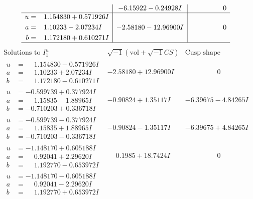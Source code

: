 \documentclass[1p]{elsarticle_modified}
\theoremstyle{definition}
\newcommand{\I}{\sqrt{-1}}
\begin{document}
$$\begin{array}{c|c|c}
 & -6.15922 - 0.24928 I & \phantom{-0.000000 } 0 \\ \hline\begin{aligned}
u &= \phantom{-}1.154830 + 0.571926 I \\
a &= \phantom{-}1.10233 - 2.07234 I \\
b &= \phantom{-}1.172180 + 0.610271 I\end{aligned}
 & -2.58180 - 12.96900 I & \phantom{-0.000000 } 0\\
 \hline 
 \end{array}$$\newpage$$\begin{array}{c|c|c}  
\text{Solutions to }I^u_{1}& \I (\text{vol} + \sqrt{-1}CS) & \text{Cusp shape}\\
 \hline 
\begin{aligned}
u &= \phantom{-}1.154830 - 0.571926 I \\
a &= \phantom{-}1.10233 + 2.07234 I \\
b &= \phantom{-}1.172180 - 0.610271 I\end{aligned}
 & -2.58180 + 12.96900 I & \phantom{-0.000000 } 0 \\ \hline\begin{aligned}
u &= -0.599739 + 0.377924 I \\
a &= \phantom{-}1.15835 - 1.88965 I \\
b &= -0.710203 + 0.336718 I\end{aligned}
 & -0.90824 + 1.35117 I & -6.39675 - 4.84265 I \\ \hline\begin{aligned}
u &= -0.599739 - 0.377924 I \\
a &= \phantom{-}1.15835 + 1.88965 I \\
b &= -0.710203 - 0.336718 I\end{aligned}
 & -0.90824 - 1.35117 I & -6.39675 + 4.84265 I \\ \hline\begin{aligned}
u &= -1.148170 + 0.605188 I \\
a &= \phantom{-}0.92041 + 2.29620 I \\
b &= \phantom{-}1.192770 - 0.653972 I\end{aligned}
 & \phantom{-}0.1985 + 18.7424 I & \phantom{-0.000000 } 0 \\ \hline\begin{aligned}
u &= -1.148170 - 0.605188 I \\
a &= \phantom{-}0.92041 - 2.29620 I \\
b &= \phantom{-}1.192770 + 0.653972 I\end{aligned}

\end{array}$$
\end{document}
